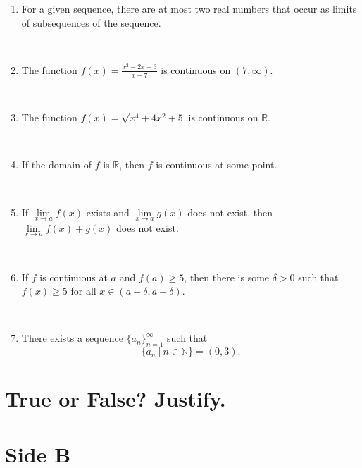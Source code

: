 \documentclass[12pt]{amsart}
\newcommand{\R}{{\mathbb{R}}}
\newcommand{\N}{\mathbb{N}}
\numberwithin{equation}{section}
\theoremstyle{plain} %
\theoremstyle{definition}
\theoremstyle{remark}
\begin{document}
\begin{enumerate}
\

 \item  For a given sequence, there are at most two real numbers that occur as limits of subsequences of the sequence.
 
 \

 	 \item  The function $\displaystyle f(x) = \frac{x^2 - 2x + 3}{x-7}$ is continuous on $(7,\infty)$.
	 
	 \
	
	 \item  The function $f(x) = \sqrt{ x^4 + 4x^2 +5}$ is continuous on $\R$.
	 
	 \
	 
	 	 \item  If the domain of $f$ is $\R$, then $f$ is continuous at some point.
	 
	 \	
	 
	 		\item If $\lim\limits_{x\to a} f(x)$ exists and $\lim\limits_{x\to a} g(x)$ does not exist, then $\lim\limits_{x\to a} f(x) + g(x)$ does not exist.
	
	\
	 
	 	 \item  If $f$ is continuous at $a$ and $f(a) \geq 5$, then there is some $\delta>0$ such that $f(x)\geq 5 $ for all $x\in (a-\delta,a+\delta)$.
	 
	 \
	 
	 	 \item There exists a sequence $\{a_n\}_{n=1}^\infty$ such that 
	 \[ \{ a_n \ | \ n\in \N \} = (0,3).\]
	 
	 

		\end{enumerate}
		
		
		
		\newpage
		
		\thispagestyle{empty}
		\section*{\large True or False? Justify.}

\medskip
		
		\section*{Side B}
		
		\
\end{document}
